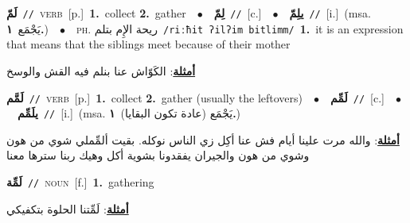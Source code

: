 \documentclass[10pt,a4paper,twoside]{article} %
\begin{document}
\begin{multicols}{2}
{\setlength\topsep{0pt}\textbf{\foreignlanguage{arabic}{لَمّ}}\ {\color{gray}\texttt{//}\color{black}}\ \textsc{verb}\ [p.]\ \textbf{1.}~collect  \textbf{2.}~gather\ \ $\bullet$\ \ \setlength\topsep{0pt}\textbf{\foreignlanguage{arabic}{لِمّ}}\ {\color{gray}\texttt{//}\color{black}}\ [c.]\ \ $\bullet$\ \ \setlength\topsep{0pt}\textbf{\foreignlanguage{arabic}{يلِمّ}}\ {\color{gray}\texttt{//}\color{black}}\ [i.]\ \color{gray}(msa. \foreignlanguage{arabic}{يَجْمَع}~\foreignlanguage{arabic}{\textbf{١.}})\color{black}\ \ $\bullet$\ \ \textsc{ph.} \color{gray} \foreignlanguage{arabic}{ريحة الإِم بتلم}\color{black}\ {\color{gray}\texttt{/{\sffamily riːħit ʔilʔim bitlimm}/}\color{black}}\ \textbf{1.}~it is an expression that means that the siblings meet because of their mother\  \begin{flushright}\color{gray}\foreignlanguage{arabic}{\textbf{\underline{\foreignlanguage{arabic}{أمثلة}}}: الكَوّاش عنا بنلم فيه القش والوسخ}\end{flushright}\color{black}} \vspace{2mm}

{\setlength\topsep{0pt}\textbf{\foreignlanguage{arabic}{لَمَّم}}\ {\color{gray}\texttt{//}\color{black}}\ \textsc{verb}\ [p.]\ \textbf{1.}~collect  \textbf{2.}~gather (usually the leftovers)\ \ $\bullet$\ \ \setlength\topsep{0pt}\textbf{\foreignlanguage{arabic}{لَمِّم}}\ {\color{gray}\texttt{//}\color{black}}\ [c.]\ \ $\bullet$\ \ \setlength\topsep{0pt}\textbf{\foreignlanguage{arabic}{يلَمِّم}}\ {\color{gray}\texttt{//}\color{black}}\ [i.]\ \color{gray}(msa. \foreignlanguage{arabic}{يَجْمَع (عادة تكون البقايا)}~\foreignlanguage{arabic}{\textbf{١.}})\color{black}\  \begin{flushright}\color{gray}\foreignlanguage{arabic}{\textbf{\underline{\foreignlanguage{arabic}{أمثلة}}}: والله مرت علينا أيام فش عنا أكِل زي الناس نوكله. بقيت ألمِّملي شوي من هون وشوي من هون والجيران يفقدونا بشوية أكل وهيك ربنا سترها معنا}\end{flushright}\color{black}} \vspace{2mm}

{\setlength\topsep{0pt}\textbf{\foreignlanguage{arabic}{لَمِّة}}\ {\color{gray}\texttt{//}\color{black}}\ \textsc{noun}\ [f.]\ \textbf{1.}~gathering\  \begin{flushright}\color{gray}\foreignlanguage{arabic}{\textbf{\underline{\foreignlanguage{arabic}{أمثلة}}}: لَمِّتنا الحلوة بتكفيكي}\end{flushright}\color{black}} \vspace{2mm}


\end{multicols}
\end{document}
